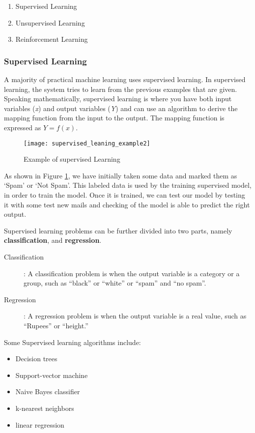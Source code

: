 \begin{enumerate}
\item Supervised Learning
\item Unsupervised Learning
\item Reinforcement Learning
\end{enumerate}

\subsubsection{Supervised Learning}
A majority of practical machine learning uses supervised learning. In supervised learning, the system tries to learn from the previous examples that are given. Speaking mathematically, supervised learning is where you have both input variables (\textit{x}) and output variables (\textit{Y}) and can use an algorithm to derive the mapping function from the input to the output. The mapping function is expressed as
$Y = f(x)$.
\begin{figure}[h]
  \centering
  \texttt{[image: supervised\_leaning\_example2]}
  \caption{Example of supervised Learning}
  \label{fig:supervised_learning_example}
\end{figure}

As shown in Figure \ref{fig:supervised_learning_example}, we have initially taken some data and marked them as ‘Spam’ or ‘Not Spam’. This
labeled data is used by the training supervised model, in order to train the model. Once it is trained, we can test our model by testing it with some test new mails and checking of the model is able to predict the right output. 

Supervised learning problems can be further divided into two parts, namely \textbf{classification}, and \textbf{regression}.
\begin{description}
\item[ Classification] : A classification problem is when the output variable is a category or a group, such as “black” or “white” or “spam” and “no spam”.
\item[ Regression ] :  A regression problem is when the output variable is a real value, such as “Rupees” or “height.”
\end{description}
Some Supervised learning algorithms include:
\begin{itemize}
\item Decision trees
\item Support-vector machine
\item Naive Bayes classifier
\item k-nearest neighbors
\item linear regression
\end{itemize}

